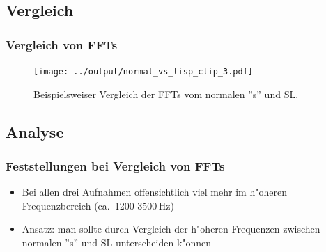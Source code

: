\documentclass[11pt]{beamer}
\begin{document}
\subsection{Vergleich}

\begin{frame}
\frametitle{Vergleich von FFTs}
\begin{figure}
\texttt{[image: ../output/normal\_vs\_lisp\_clip\_3.pdf]}
\caption{Beispielsweiser Vergleich der FFTs vom normalen ''s'' und SL.}
\end{figure}
\end{frame}

\subsection{Analyse}

\begin{frame}
\frametitle{Feststellungen bei Vergleich von FFTs}
\begin{itemize}
\item Bei allen drei Aufnahmen offensichtlich viel mehr im h"oheren Frequenzbereich (ca.\ 1200-3500\,Hz)
\item Ansatz: man sollte durch Vergleich der h"oheren Frequenzen zwischen normalen ''s'' und SL unterscheiden k"onnen
\end{itemize}
\end{frame}
\end{document}
